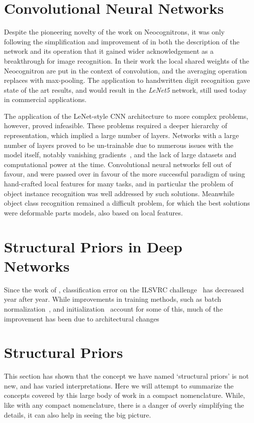 \documentclass[thesis]{subfiles}
\begin{document}
	\section{Convolutional Neural Networks}
	
	Despite the pioneering novelty of the work on Neocognitrons, it was only following the simplification and improvement of \citet{lecun1989backpropagation,Lecun1998} in both the description of the network and its operation that it gained wider acknowledgement as a breakthrough for image recognition. In their work the local shared weights of the Neocognitron are put in the context of convolution, and the averaging operation replaces with max-pooling. The application to handwritten digit recognition gave state of the art results, and would result in the \emph{LeNet5} network, still used today in commercial applications.
	
	The application of the LeNet-style CNN architecture to more complex problems, however, proved infeasible. These problems required a deeper hierarchy of representation, which implied a large number of layers. Networks with a large number of layers proved to be un-trainable due to numerous issues with the model itself, notably vanishing gradients~\citep{hochreiter1991untersuchungen}, and the lack of large datasets and computational power at the time. Convolutional neural networks fell out of favour, and were passed over in favour of the more successful paradigm of using hand-crafted local features for many tasks, and in particular the problem of object instance recognition was well addressed by such solutions. Meanwhile object class recognition remained a difficult problem, for which the best solutions were deformable parts models, also based on local features.
	
\section{Structural Priors in Deep Networks}
Since the work of \citet{Krizhevsky2012}, classification error on the ILSVRC challenge~\citep{ILSVRC2015} has decreased year after year. While improvements in training methods, such as batch normalization~\citep{Ioffe2015}, and initialization~\citep{He2015b} account for some of this, much of the improvement has been due to architectural changes
	\citep{Simonyan2014verydeep}
	\citep{He2015}
	\citep{He2016}


\section{Structural Priors}
    This section has shown that the concept we have named `structural priors' is not new, and has varied interpretations. Here we will attempt to summarize the concepts covered by this large body of work in a compact nomenclature. While, like with any compact nomenclature, there is a danger of overly simplifying the details, it can also help in seeing the big picture.
    
\end{document}
